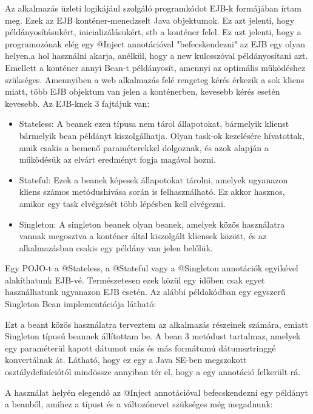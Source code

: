 \documentclass[centeredchapter]{thesis-ekf}
\theoremstyle{definition}
\theoremstyle{remark}
\begin{document}
Az alkalmazás üzleti logikájául szolgáló programkódot EJB-k formájában írtam meg.
Ezek az EJB konténer-menedzselt Java objektumok. Ez azt jelenti, hogy példányosításukért, inicializálásukért, stb a konténer felel. Ez azt jelenti, hogy a programozónak elég egy @Inject annotációval "befecskendezni" az EJB egy olyan helyen,a hol használni akarja, anélkül, hogy a new kulcsszóval példányosítani azt. Emellett a konténer annyi Bean-t példányosít, amennyi az optimális működéshez szükséges. Amennyiben a web alkalmazás felé rengeteg kérés érkezik a sok kliens miatt, több EJB objektum van jelen a konténerben, kevesebb kérés esetén kevesebb.
Az EJB-knek 3 fajtájuk van:
\begin{itemize}
	\item Stateless: A beanek ezen típusa nem tárol állapotokat, bármelyik klienst bármelyik bean példányt kiszolgálhatja. Olyan task-ok kezelésére hívatottak, amik csakis a bemenő paraméterekkel dolgoznak, és azok alapján a működésük az elvárt eredményt fogja magával hozni.
	\item Stateful: Ezek a beanek képesek állapotokat tárolni, amelyek ugyanazon kliens számos metódushívása során is felhasználható. Ez akkor hasznos, amikor egy task elvégzését több lépésben kell elvégezni.
	\item Singleton: A singleton beanek olyan beanek, amelyek közös használatra vannak megosztva a konténer által kiszolgált kliensek között, és az alkalmazásban csakis egy példány van jelen belőlük.
\end{itemize}

Egy POJO-t a @Stateless, a @Stateful vagy a @Singleton annotációk egyikével alakíthatunk EJB-vé. Természetesen ezek közül egy időben csak egyet használhatunk ugyanazon EJB esetén. Az alábbi példakódban egy egyszerű Singleton Bean implementációja látható:



Ezt a beant közös használatra terveztem az alkalmazás részeinek számára, emiatt Singleton típusú beannek állítottam be. A bean 3 metódust tartalmaz, amelyek egy paraméterül kapott dátumot más és más formátumú dátumsztringgé konvertálnak át. Látható, hogy ez egy a Java SE-ben megszokott osztálydefiníciótól mindössze annyiban tér el, hogy a egy annotáció felkerült rá. 

A használat helyén elegendő az @Inject annotációval befecskendezni egy példányt a beanből, amihez a típust és a változónevet szükséges még megadnunk:
\end{document}
